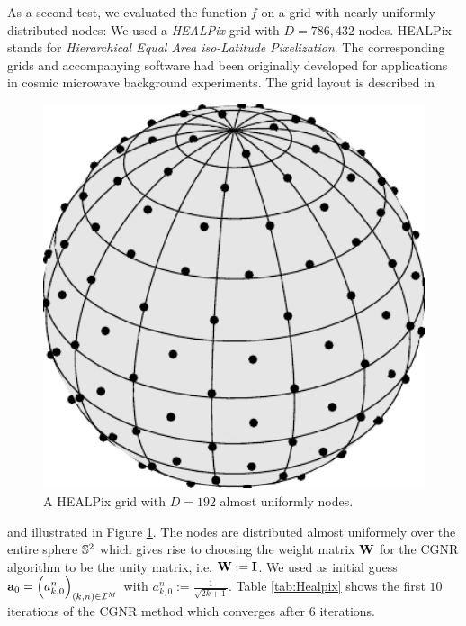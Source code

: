 \begin{example}
    As a second test, we evaluated the function $f$ on a grid with nearly uniformly distributed
    nodes: We used a \emph{HEALPix} grid with $D=786,432$ nodes. HEALPix stands for 
    \emph{Hierarchical Equal Area iso-Latitude Pixelization}. The corresponding grids 
    and accompanying software had been originally developed for applications in 
    cosmic microwave background experiments. The grid layout is described in 
    \begin{figure}[tb]
      \centering
      \includegraphics[width=12cm]{images/healpix}
      \caption{A HEALPix grid with $D = 192$ almost uniformly nodes.}
      \label{Applications:healpix}
    \end{figure}  
    \cite{healpix}and illustrated in Figure \ref{Applications:healpix}. The nodes are distributed 
    almost uniformely over the entire sphere $\mathbb{S}^2$ which gives rise to choosing the weight matrix 
    $\mathbf{W}$ for the CGNR algorithm to be the unity matrix, i.e. $\mathbf{W} := \mathbf{I}$. We used as 
    initial guess $\mathbf{a}_{0} = \left(a_{k,0}^n\right)_{(k,n) \in \mathcal{I}^M}$ with $a_{k,0}^n := 
    \frac{1}{\sqrt{2k+1}}$. Table \ref{tab:Healpix} shows the first $10$ iterations of the CGNR method which 
    converges after 6 iterations.    
    

\end{example}
